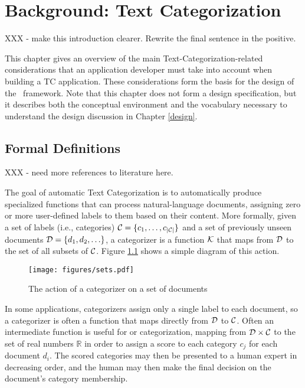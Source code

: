 \chapter{Background: Text Categorization}
\label{background-tc}

XXX - make this introduction clearer.  Rewrite the final sentence in the positive.

This chapter gives an overview of the main Text-Categorization-related
considerations that an application developer must take into account
when building a TC application.  These considerations form the basis
for the design of the \aicat\ framework.  Note that this chapter does
not form a design specification, but it describes both the conceptual
environment and the vocabulary necessary to understand the design
discussion in Chapter \ref{design}.

\section{Formal Definitions}

XXX - need more references to literature here.

The goal of automatic Text Categorization is to automatically produce specialized
functions that can process natural-language documents, assigning zero
or more user-defined labels to them based on their content.  More
formally, given a set of labels (i.e., categories) $\mathcal{C} = \{c_1, \ldots, c_{|\mathcal{C}|}\}$ and a set of
previously unseen documents $\mathcal{D} = \{d_1, d_2, \ldots \}$, a categorizer is a
function $\mathcal{K}$ that maps from $\mathcal{D}$ to the set of all subsets of
$\mathcal{C}$.  Figure \ref{sets} shows a simple diagram of this action.

\begin{figure}
\begin{center}
\texttt{[image: figures/sets.pdf]}
\caption{The action of a categorizer on a set of documents}
\label{sets}
\end{center}
\end{figure}

In
some applications, categorizers assign only a single label to each
document, so a categorizer is often a function that maps directly from
$\mathcal{D}$ to $\mathcal{C}$.  Often an intermediate function is useful for  or 
 categorization, mapping from $\mathcal{D} \times \mathcal{C}$ to
the set of real numbers $\mathbb{R}$ in order to assign a score to
each category $c_j$ for each document $d_i$.  The scored categories
may then be presented to a human expert in decreasing order, and the
human may then make the final decision on the document's category
membership.

